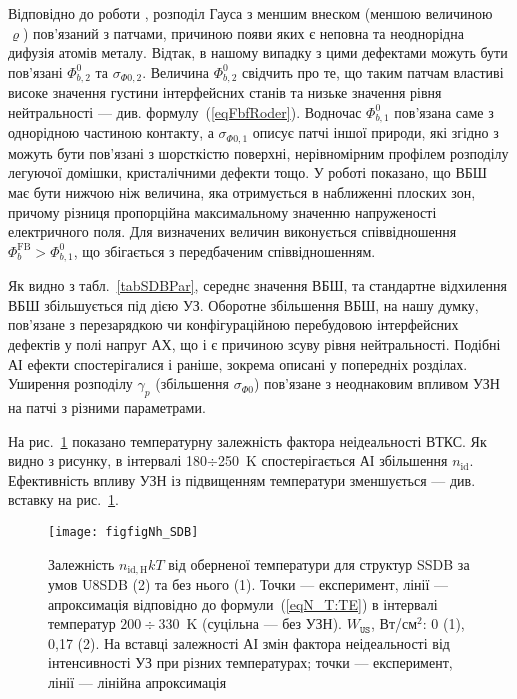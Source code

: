 Відповідно до роботи \cite{Jiang:DGJap},
розподіл Гауса з меншим внеском (меншою величиною $\varrho$) пов'язаний з патчами, причиною появи яких є
неповна та неоднорідна дифузія атомів металу.
Відтак, в нашому випадку з цими дефектами можуть бути пов'язані $\Phi_{b,2}^0$ та $\sigma_{\Phi0,2}$.
Величина $\Phi_{b,2}^0$ свідчить про те, що таким патчам властиві високе значення густини інтерфейсних станів та низьке значення рівня нейтральності --- див. формулу~(\ref{eqFbfRoder}).
Водночас $\Phi_{b,1}^0$ пов'язана саме з однорідною частиною контакту,
а $\sigma_{\Phi0,1}$ описує патчі іншої природи, які згідно з \cite{Gammon2013} можуть бути пов'язані з шорсткістю поверхні,
нерівномірним профілем розподілу легуючої домішки, кристалічними дефекти тощо.
У роботі \cite{Rhoderick1988} показано, що ВБШ має бути нижчою ніж величина, яка отримується в наближенні плоских зон,
причому різниця пропорційна максимальному значенню напруженості електричного поля.
Для визначених величин виконується співвідношення $\Phi_{b}^\mathrm{FB}>\Phi_{b,1}^0$, що  збігається з передбаченим співвідношенням.

Як видно з табл.~\ref{tabSDBPar}, середнє значення ВБШ, та стандартне відхилення ВБШ збільшується під дією УЗ.
Оборотне збільшення ВБШ, на нашу думку, пов'язане з перезарядкою чи конфігураційною перебудовою інтерфейсних дефектів у полі напруг
АХ, що і є причиною зсуву рівня нейтральності.
Подібні АІ ефекти спостерігалися і раніше, зокрема описані у попередніх розділах.
Уширення розподілу $\gamma_p$ (збільшення $\sigma_{\Phi0}$) пов'язане з неоднаковим впливом УЗН на патчі з різними параметрами.

На рис.~\ref{figfigNh_SDB} показано температурну залежність фактора неідеальності ВТКС.
Як видно з рисунку, в інтервалі 180$\div$250~K спостерігається АІ збільшення $n_\mathrm{id}$.
Ефективність впливу УЗН із підвищенням температури зменшується --- див. вставку на рис.~\ref{figfigNh_SDB}.

\begin{figure}
\center
\texttt{[image: figfigNh\_SDB]}
\caption{\label{figfigNh_SDB}
Залежність $n_\mathrm{id,H}kT$ від оберненої температури для структур SSDB за умов U8SDB (2) та без нього (1).
Точки --- експеримент, лінії --- апроксимація відповідно до формули~(\ref{eqN_T:TE}) в інтервалі
температур $200\div330$~K (суцільна --- без УЗН).
$W_\mathtt{US}$,  Вт/см$^2$: 0 (1), 0,17 (2).
На вставці залежності АІ змін фактора неідеальності від інтенсивності УЗ при різних температурах;
точки --- експеримент, лінії --- лінійна апроксимація
}%
\end{figure}

